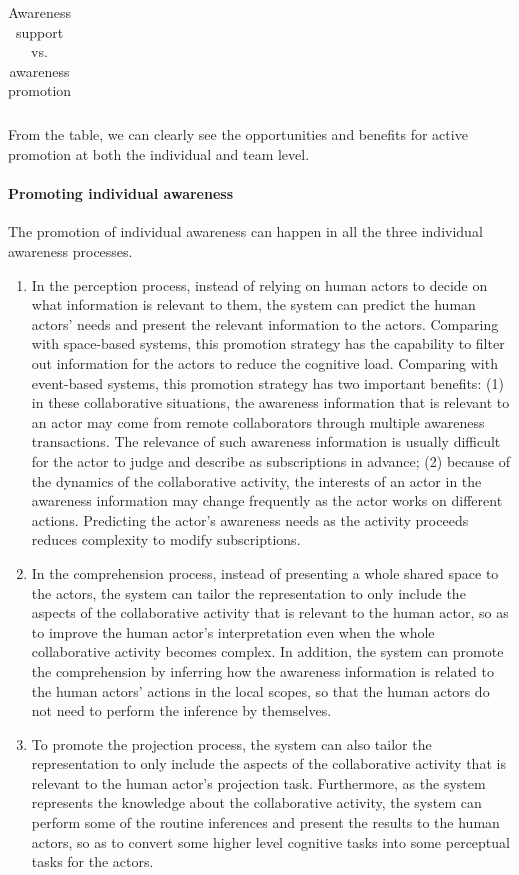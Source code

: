 \begin{table}[htbp]
\begin{tabular}{>{\raggedright}p{1.1in}>{\raggedright}p{2.2in}>{\raggedright}p{2.2in}}
\end{tabular}  
\caption{Awareness support vs. awareness promotion}
\label{tab:awareness_support_vs_promotion}
\end{table}

From the table, we can clearly see the opportunities and benefits for active promotion at both the individual and team level.

\paragraph*{Promoting individual awareness} %
\label{par:promoting_individual_awareness}
The promotion of individual awareness can happen in all the three individual awareness processes. 
\begin{enumerate}
   \item In the perception process, instead of relying on human actors to decide on what information is relevant to them, the system can predict the human actors' needs and present the relevant information to the actors. Comparing with space-based systems, this promotion strategy has the capability to filter out information for the actors to reduce the cognitive load. Comparing with event-based systems, this promotion strategy has two important benefits: (1) in these collaborative situations, the awareness information that is relevant to an actor may come from remote collaborators through multiple awareness transactions. The relevance of such awareness information is usually difficult for the actor to judge and describe as subscriptions in advance; (2) because of the dynamics of the collaborative activity, the interests of an actor in the awareness information may change frequently as the actor works on different actions. Predicting the actor's awareness needs as the activity proceeds reduces complexity to modify subscriptions.
   \item In the comprehension process, instead of presenting a whole shared space to the actors, the system can tailor the representation to only include the aspects of the collaborative activity that is relevant to the human actor, so as to improve the human actor's interpretation even when the whole collaborative activity becomes complex. In addition, the system can promote the comprehension by inferring how the awareness information is related to the human actors' actions in the local scopes, so that the human actors do not need to perform the inference by themselves.
   \item To promote the projection process, the system can also tailor the representation to only include the aspects of the collaborative activity that is relevant to the human actor's projection task. Furthermore, as the system represents the knowledge about the collaborative activity, the system can perform some of the routine inferences and present the results to the human actors, so as to convert some higher level cognitive tasks into some perceptual tasks for the actors.
\end{enumerate}

